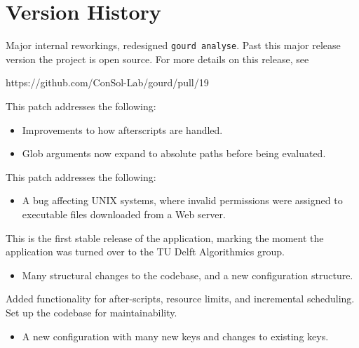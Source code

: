 \pagebreak

\section{Version History}




Major internal reworkings, redesigned \texttt{gourd analyse}.
Past this major release version the project is open source.
For more details on this release, see 

https://github.com/ConSol-Lab/gourd/pull/19


This patch addresses the following:
\begin{itemize}
\item Improvements to how afterscripts are handled.
\item Glob arguments now expand to absolute paths
      before being evaluated.
\end{itemize}


This patch addresses the following:
\begin{itemize}
\item A bug affecting UNIX systems, where invalid
      permissions were assigned to executable files
      downloaded from a Web server.
\end{itemize}


This is the first stable release of the application,
marking the moment the application was turned over
to the TU Delft Algorithmics group.

\breakingchanges
\begin{itemize}
\item Many structural changes to the codebase, and a
  new configuration structure.
\end{itemize}


Added functionality for after-scripts, resource limits,
and incremental scheduling.
Set up the codebase for maintainability.

\breakingchanges
\begin{itemize}
\item A new configuration with many new keys and
changes to existing keys.
\end{itemize}

